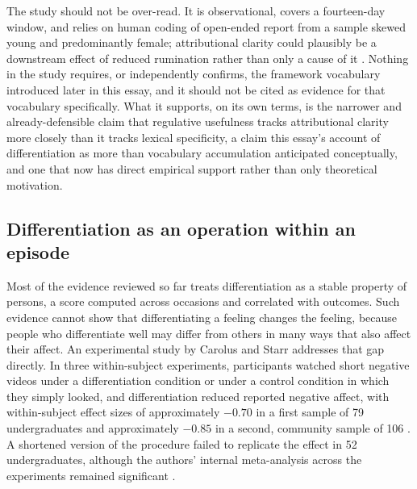 \documentclass[11pt]{article}
\begin{document}
The study should not be over-read. It is observational, covers a fourteen-day window, and relies on human coding of open-ended report from a sample skewed young and predominantly female; attributional clarity could plausibly be a downstream effect of reduced rumination rather than only a cause of it \citep{LunsfordEddington2026}. Nothing in the study requires, or independently confirms, the framework vocabulary introduced later in this essay, and it should not be cited as evidence for that vocabulary specifically. What it supports, on its own terms, is the narrower and already-defensible claim that regulative usefulness tracks attributional clarity more closely than it tracks lexical specificity, a claim this essay's account of differentiation as more than vocabulary accumulation anticipated conceptually, and one that now has direct empirical support rather than only theoretical motivation.

\subsection{Differentiation as an operation within an episode}\label{sub:operation}

Most of the evidence reviewed so far treats differentiation as a stable property of persons, a score computed across occasions and correlated with outcomes. Such evidence cannot show that differentiating a feeling changes the feeling, because people who differentiate well may differ from others in many ways that also affect their affect. An experimental study by Carolus and Starr addresses that gap directly. In three within-subject experiments, participants watched short negative videos under a differentiation condition or under a control condition in which they simply looked, and differentiation reduced reported negative affect, with within-subject effect sizes of approximately $-0.70$ in a first sample of 79 undergraduates and approximately $-0.85$ in a second, community sample of 106 \citep{CarolusStarr2026}. A shortened version of the procedure failed to replicate the effect in 52 undergraduates, although the authors' internal meta-analysis across the experiments remained significant \citep{CarolusStarr2026}.
\end{document}

